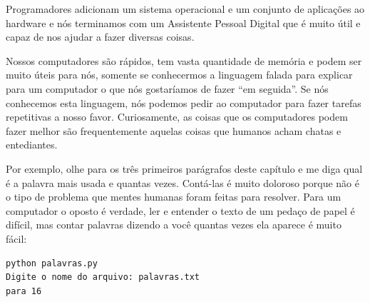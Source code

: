 Programadores adicionam um sistema operacional e um conjunto de
aplicações ao hardware e nós terminamos com um Assistente
Pessoal Digital que é muito útil e capaz de nos ajudar a fazer
diversas coisas.

Nossos computadores são rápidos, tem vasta quantidade de memória
e podem ser muito úteis para nós, somente se conhecermos a linguagem
falada para explicar para um computador o que nós gostaríamos
de fazer ``em seguida''. Se nós conhecemos esta linguagem, nós
podemos pedir ao computador para fazer tarefas repetitivas a
nosso favor. Curiosamente, as coisas que os computadores
podem fazer melhor são frequentemente aquelas coisas que humanos
acham chatas e entediantes.

Por exemplo, olhe para os três primeiros parágrafos deste
capítulo e me diga qual é a palavra mais usada e quantas
vezes. Contá-las é muito doloroso porque
não é o tipo de problema que mentes humanas foram feitas para
resolver. Para um computador o oposto é verdade, ler e entender o texto
de um pedaço de papel é difícil, mas contar palavras dizendo a
você quantas vezes ela aparece é muito fácil:

\beforeverb
\begin{verbatim}
python palavras.py
Digite o nome do arquivo: palavras.txt
para 16
\end{verbatim}
\afterverb


